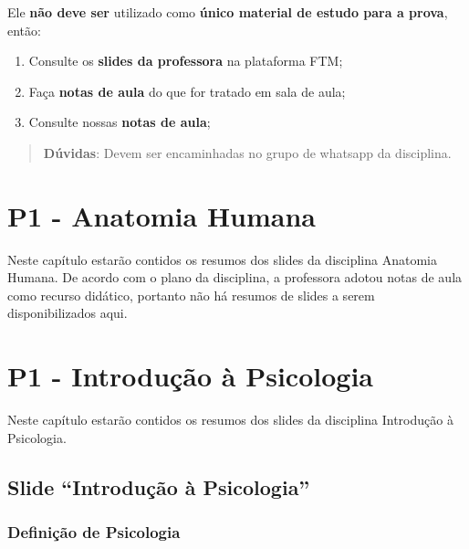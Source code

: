 \documentclass[
]{book}
\providecommand{\tightlist}{%
  \setlength{\itemsep}{0pt}\setlength{\parskip}{0pt}}
\begin{document}
Ele \textbf{não deve ser} utilizado como \textbf{único material de estudo para a prova}, então:

\begin{enumerate}
\def\labelenumi{\arabic{enumi}.}
\tightlist
\item
  Consulte os \textbf{slides da professora} na plataforma FTM;\\
\item
  Faça \textbf{notas de aula} do que for tratado em sala de aula;\\
\item
  Consulte nossas \textbf{notas de aula};
\end{enumerate}

\begin{quote}
\textbf{Dúvidas}: Devem ser encaminhadas no grupo de whatsapp da disciplina.
\end{quote}

\hypertarget{p1---anatomia-humana}{%
\chapter{P1 - Anatomia Humana}\label{p1---anatomia-humana}}

Neste capítulo estarão contidos os resumos dos slides da disciplina Anatomia Humana. De acordo com o plano da disciplina, a professora adotou notas de aula como recurso didático, portanto não há resumos de slides a serem disponibilizados aqui.

\hypertarget{p1---introduuxe7uxe3o-uxe0-psicologia}{%
\chapter{P1 - Introdução à Psicologia}\label{p1---introduuxe7uxe3o-uxe0-psicologia}}

Neste capítulo estarão contidos os resumos dos slides da disciplina Introdução à Psicologia.

\hypertarget{slide-introduuxe7uxe3o-uxe0-psicologia}{%
\section{Slide ``Introdução à Psicologia''}\label{slide-introduuxe7uxe3o-uxe0-psicologia}}

\hypertarget{definiuxe7uxe3o-de-psicologia}{%
\subsection{Definição de Psicologia}\label{definiuxe7uxe3o-de-psicologia}}
\end{document}
